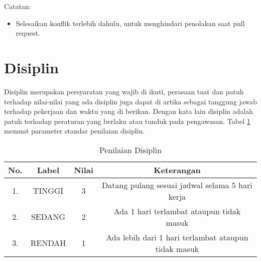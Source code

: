 Catatan:
\begin{itemize}
\item Selesaikan konflik terlebih dahulu, untuk menghindari penolakan saat pull request.
\end{itemize}

\section{Disiplin}
Disiplin merupakan persyaratan yang wajib di ikuti, perasaan taat dan patuh terhadap nilai-nilai yang ada disiplin juga dapat di artika sebagai tanggung jawab terhadap pekerjaan dan waktu yang di berikan. Dengan kata lain disiplin adalah patuh terhadap peraturan yang berlaku
atau tunduk pada pengawasan. Tabel \ref{table:nilaidisiplin} memuat parameter standar penilaian disiplin.

\begin{table}[H]
\caption{Penilaian Disiplin}
\centering
\begin{tabular}{|c|c|c|c|}
\hline
\textbf{No.}&\textbf{Label}&\textbf{Nilai}&\textbf{Keterangan}\\
\hline
1.&TINGGI&3&Datang pulang sesuai jadwal selama 5 hari kerja\\
\hline
2.&SEDANG&2&Ada 1 hari terlambat ataupun tidak masuk\\
\hline
3.&RENDAH&1&Ada lebih dari 1 hari terlambat ataupun tidak masuk\\
\hline
\end{tabular}
\label{table:nilaidisiplin}
\end{table}

